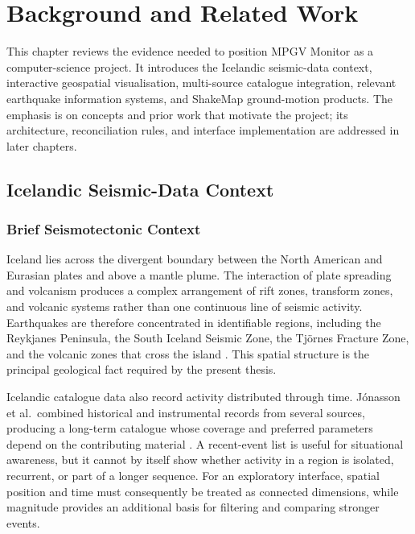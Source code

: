 \documentclass[12pt]{article}
\begin{document}
\section{Background and Related Work}

This chapter reviews the evidence needed to position MPGV Monitor as a computer-science project. It introduces the Icelandic seismic-data context, interactive geospatial visualisation, multi-source catalogue integration, relevant earthquake information systems, and ShakeMap ground-motion products. The emphasis is on concepts and prior work that motivate the project; its architecture, reconciliation rules, and interface implementation are addressed in later chapters.

\subsection{Icelandic Seismic-Data Context}

\subsubsection{Brief Seismotectonic Context}

Iceland lies across the divergent boundary between the North American and Eurasian plates and above a mantle plume. The interaction of plate spreading and volcanism produces a complex arrangement of rift zones, transform zones, and volcanic systems rather than one continuous line of seismic activity. Earthquakes are therefore concentrated in identifiable regions, including the Reykjanes Peninsula, the South Iceland Seismic Zone, the Tj{\"o}rnes Fracture Zone, and the volcanic zones that cross the island \cite[pp.~35--37]{Einarsson2008}. This spatial structure is the principal geological fact required by the present thesis.

Icelandic catalogue data also record activity distributed through time. J\'onasson et al.\ combined historical and instrumental records from several sources, producing a long-term catalogue whose coverage and preferred parameters depend on the contributing material \cite[pp.~2197--2200]{Jonasson2021}. A recent-event list is useful for situational awareness, but it cannot by itself show whether activity in a region is isolated, recurrent, or part of a longer sequence. For an exploratory interface, spatial position and time must consequently be treated as connected dimensions, while magnitude provides an additional basis for filtering and comparing stronger events.
\end{document}
